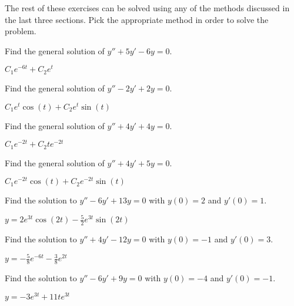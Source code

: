 \noindent The rest of these exercises can be solved using any of the methods discussed in the last three sections. Pick the appropriate method in order to solve the problem.

\begin{exercise}
Find the general solution of $y'' + 5y' - 6y = 0$.
\end{exercise}
\comboSol{%
}
{%
$C_1e^{-6t} + C_2e^t$
}

\begin{exercise}
Find the general solution of $y'' - 2y' + 2y = 0$.
\end{exercise}
\comboSol{%
}
{%
$C_1e^t\cos(t) + C_2e^t\sin(t)$
}

\begin{exercise}
Find the general solution of $y'' + 4y' + 4y = 0$.
\end{exercise}
\comboSol{%
}
{%
$C_1e^{-2t} + C_2te^{-2t}$
}

\begin{exercise}
Find the general solution of $y'' + 4y' + 5y = 0$.
\end{exercise}
\comboSol{%
}
{%
$C_1e^{-2t}\cos(t) + C_2e^{-2t}\sin(t)$
}

\begin{exercise}
Find the solution to $y'' - 6y' + 13y = 0$ with $y(0) = 2$ and $y'(0) = 1$. 
\end{exercise}
\comboSol{%
}
{%
$y = 2e^{3t}\cos(2t) - \frac{5}{2}e^{3t}\sin(2t)$
}

\begin{exercise}
Find the solution to $y'' + 4y' - 12y = 0$ with $y(0) = -1$ and $y'(0) = 3$. 
\end{exercise}
\comboSol{%
}
{%
$y= -\frac{5}{8}e^{-6t} - \frac{3}{8}e^{2t}$
}

\begin{exercise}
Find the solution to $y'' - 6y' + 9y = 0$ with $y(0) = -4$ and $y'(0) = -1$. 
\end{exercise}
\comboSol{%
}
{%
$y = -3e^{3t} + 11te^{3t}$
}



